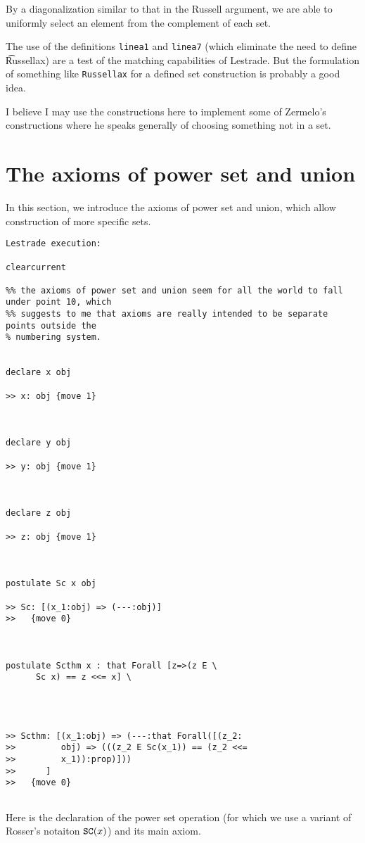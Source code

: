 \documentclass[12pt]{article}
\begin{document}
By a diagonalization similar to that in the Russell argument, we are able to uniformly select an element from the complement of each set.

The use of the definitions {\tt linea1} and {\tt linea7} (which eliminate the need to define {\t Russellax}) are a test of the matching capabilities of Lestrade.  But the formulation of something like {\tt Russellax} for a defined set construction is probably a good idea.

I believe I may use the constructions here to implement some of Zermelo's constructions where he speaks generally of choosing something not in a set.

\section{The axioms of power set and union}

In this section, we introduce the axioms of power set and union, which allow construction of more specific sets.

\begin{verbatim}Lestrade execution:

clearcurrent

%% the axioms of power set and union seem for all the world to fall under point 10, which
%% suggests to me that axioms are really intended to be separate points outside the 
% numbering system.


declare x obj

>> x: obj {move 1}



declare y obj

>> y: obj {move 1}



declare z obj

>> z: obj {move 1}



postulate Sc x obj

>> Sc: [(x_1:obj) => (---:obj)]
>>   {move 0}



postulate Scthm x : that Forall [z=>(z E \
      Sc x) == z <<= x] \
   



>> Scthm: [(x_1:obj) => (---:that Forall([(z_2:
>>         obj) => (((z_2 E Sc(x_1)) == (z_2 <<=
>>         x_1)):prop)]))
>>      ]
>>   {move 0}


\end{verbatim}

Here is the declaration of the power set operation (for which we use a variant of Rosser's notaiton ${\tt SC}(x)$) and its main axiom.
\end{document}

